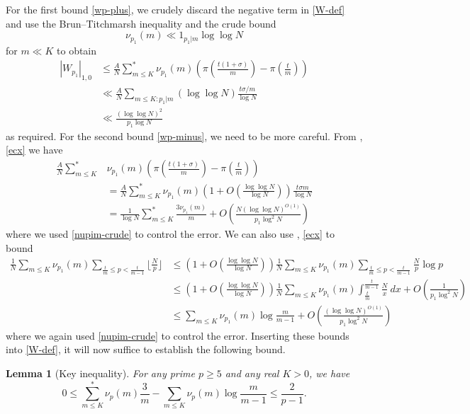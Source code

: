 \documentclass[12pt,a4paper,reqno]{amsart}
\numberwithin{equation}{section}
\theoremstyle{plain}
\newtheorem{lemma}[theorem]{Lemma}
\theoremstyle{definition}
\begin{document}
For the first bound \eqref{wp-plus}, we crudely discard the negative term in \eqref{W-def} and use the Brun--Titchmarsh inequality and the crude bound
\begin{equation}\label{nupim-crude} 
  \nu_{p_1}(m) \ll 1_{p_1|m} \log\log N
\end{equation}
for $m \ll K$ to obtain
\begin{align*}
|W_{p_1}|_{1,0} &\leq \frac{A}{N} \sum_{m \leq K}^* \nu_{p_1}(m) \left(\pi\left(\frac{t(1+\sigma)}{m}\right) - \pi\left(\frac{t}{m}\right)\right) \\
&\ll \frac{A}{N} \sum_{m \leq K:p_1|m} (\log\log N) \frac{t\sigma/m}{\log N} \\
&\ll \frac{(\log\log N)^2}{p_1 \log N}
\end{align*}
as required.  For the second bound \eqref{wp-minus}, we need to be more careful.  From , \eqref{ecx} we have
\begin{align*}
\frac{A}{N} \sum_{m \leq K}^*& \nu_{p_1}(m) \left(\pi\left(\frac{t(1+\sigma)}{m}\right) - \pi\left(\frac{t}{m}\right)\right) \\
  &= \frac{A}{N} \sum_{m \leq K}^* \nu_{p_1}(m) (1+O(\frac{\log\log N}{\log N})) \frac{t\sigma m}{\log N} \\
  &= \frac{1}{\log N} \sum_{m \leq K}^* \frac{3\nu_{p_1}(m)}{m}
 + O\left(\frac{N (\log\log N)^{O(1)}}{p_1 \log^2 N}\right)
\end{align*}
where we used \eqref{nupim-crude} to control the error.  We can also use , \eqref{ecx} to bound
\begin{align*}
  \frac{1}{N} \sum_{m \leq K} \nu_{p_1}(m) \sum_{\frac{t}{m} \leq p < \frac{t}{m-1}} \lfloor \frac{N}{p} \rfloor
&\leq  \left(1 + O\left(\frac{\log\log N}{\log N}\right)\right)  \frac{1}{N} \sum_{m \leq K} \nu_{p_1}(m)
\sum_{\frac{t}{m} \leq p < \frac{t}{m-1}} \frac{N}{p} \log p \\
&\leq  \left(1 + O\left(\frac{\log\log N}{\log N}\right)\right)  \frac{1}{N} \sum_{m \leq K} \nu_{p_1}(m)
\int_{\frac{t}{m}}^{\frac{t}{m-1}} \frac{N}{x}\ dx +
O\left( \frac{1}{p_1 \log^2 N} \right) \\
&\leq \sum_{m \leq K} \nu_{p_1}(m) \log\frac{m}{m-1} +
O\left( \frac{(\log\log N)^{O(1)}}{p_1 \log^2 N} \right) 
\end{align*}
where we again used \eqref{nupim-crude} to control the error.  Inserting these bounds into \eqref{W-def}, it will now suffice to establish the following bound.

\begin{lemma}[Key inequality]\label{key-ineq} For any prime $p\geq 5$ and any real $K > 0$, we have
$$ 0 \leq \sum_{m \leq K}^* \nu_p(m) \frac{3}{m} - \sum_{m \leq K} \nu_p(m) \log \frac{m}{m-1} \leq \frac{2}{p-1}.$$
\end{lemma}
\end{document}

